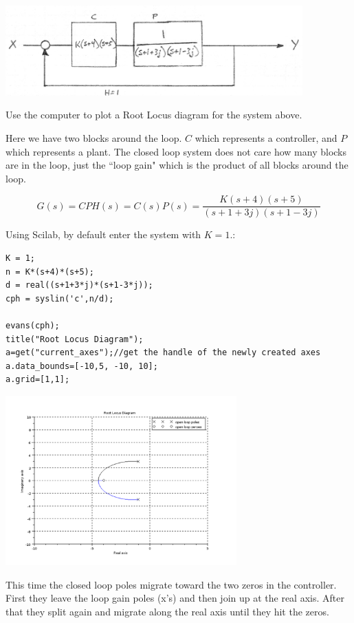 \begin{ExampleSmall}\label{contplantrootlocus}


\includegraphics[width=4.5in]{figs07/00780a.png}


Use the computer to plot a Root Locus diagram for the system above.

Here we have two blocks around the loop.  $C$ which represents a controller, and $P$ which represents a plant.  The closed loop system does not care how many blocks are in the loop, just the ``loop gain" which is the product of all blocks around the loop.

\[
G(s) = CPH(s) = C(s)P(s) = \frac {K(s+4)(s+5)}   {(s+1+3j)(s+1-3j)}
\]

\vspace{0.25in}
Using Scilab, by default enter the system with $K=1$.:


\begin{verbatim}
K = 1;
n = K*(s+4)*(s+5);
d = real((s+1+3*j)*(s+1-3*j));
cph = syslin('c',n/d);

evans(cph);
title("Root Locus Diagram");
a=get("current_axes");//get the handle of the newly created axes
a.data_bounds=[-10,5, -10, 10];
a.grid=[1,1];
\end{verbatim}

\includegraphics[width=3.5in]{figs07/rlexample2a.png}

This time the closed loop poles migrate toward the two zeros in the controller.  First they leave the loop gain poles (x's) and then join up at the real axis. After that  they split again and migrate along the real axis until they hit the zeros.
\end{ExampleSmall}







